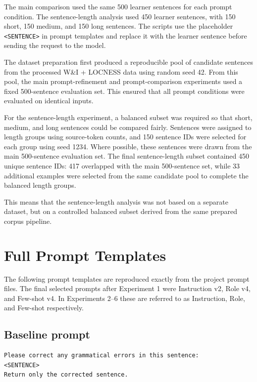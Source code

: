 The main comparison used the same 500 learner sentences for each prompt condition. The sentence-length analysis used 450 learner sentences, with 150 short, 150 medium, and 150 long sentences. The scripts use the placeholder \texttt{<SENTENCE>} in prompt templates and replace it with the learner sentence before sending the request to the model.

The dataset preparation first produced a reproducible pool of candidate sentences from the processed W\&I + LOCNESS data using random seed 42. From this pool, the main prompt-refinement and prompt-comparison experiments used a fixed 500-sentence evaluation set. This ensured that all prompt conditions were evaluated on identical inputs.

For the sentence-length experiment, a balanced subset was required so that short, medium, and long sentences could be compared fairly. Sentences were assigned to length groups using source-token counts, and 150 sentence IDs were selected for each group using seed 1234. Where possible, these sentences were drawn from the main 500-sentence evaluation set. The final sentence-length subset contained 450 unique sentence IDs: 417 overlapped with the main 500-sentence set, while 33 additional examples were selected from the same candidate pool to complete the balanced length groups.

This means that the sentence-length analysis was not based on a separate dataset, but on a controlled balanced subset derived from the same prepared corpus pipeline.

\section{Full Prompt Templates}
\label{app:prompt-templates}

The following prompt templates are reproduced exactly from the project prompt files. The final selected prompts after Experiment 1 were Instruction v2, Role v4, and Few-shot v4. In Experiments 2--6 these are referred to as Instruction, Role, and Few-shot respectively.

\subsection{Baseline prompt}
\begin{verbatim}
Please correct any grammatical errors in this sentence:
<SENTENCE>
Return only the corrected sentence.
\end{verbatim}

